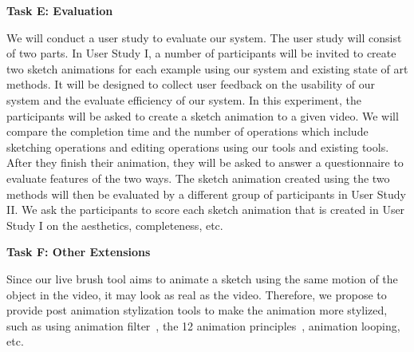 \textbf{Task E: Evaluation}


We will conduct a user study to evaluate our system. The user study will consist of two parts. In User Study I, a number of participants will be invited to create two sketch animations for each example using our system and existing state of art methods. It will be designed to collect user feedback on the usability of our system and the evaluate efficiency of our system. In this experiment, the participants will be asked to create a sketch animation to a given video. We will compare the completion time and the number of operations which include sketching operations and editing operations using our tools and existing tools. After they finish their animation, they will be asked to answer a questionnaire to evaluate features of the two ways.
The sketch animation created using the two methods will then be evaluated by a different group of participants in User Study II.
We ask the participants to score each sketch animation that is created in User Study I on the aesthetics, completeness, etc. 


\textbf{Task F: Other Extensions}

Since our live brush tool aims to animate a sketch using the same motion of the object in the video, it may look as real as the video. Therefore, we propose to provide post animation stylization tools to make the animation more stylized, such as using animation filter~\cite{Wang:2006}, the 12 animation principles~\cite{Kazi:2016}, animation looping, etc.


